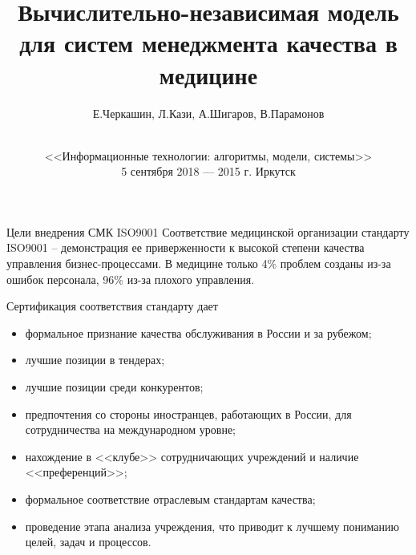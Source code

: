 \documentclass[10pt]{beamer}
\begin{document}
\title[Моделирование системы менеджмента качества в медицине]{Вычислительно-независимая модель для систем менеджмента качества в медицине}
\author{Е.Черкашин, Л.Кази, А.Шигаров, В.Парамонов}
\date[2015]{{}\\[1.5cm]
<<Информационные технологии: алгоритмы, модели, системы>>\\
5 сентября 2018 --- 2015 г.
Иркутск
}
\maketitle

\begin{frame}{Цели внедрения СМК ISO9001}
  Соответствие медицинской организации стандарту ISO9001 -- демонстрация ее приверженности к высокой степени качества управления бизнес-процессами. В медицине только 4\% проблем созданы из-за ошибок персонала, 96\% из-за плохого управления.
  \begin{block}{Сертификация соответствия стандарту дает}
    \begin{itemize}
    \item формальное признание качества обслуживания в России и за рубежом;
    \item лучшие позиции в тендерах;
    \item лучшие позиции среди конкурентов;
    \item предпочтения со стороны иностранцев, работающих в России, для сотрудничества на международном уровне;
    \item нахождение в <<клубе>> сотрудничающих учреждений и наличие <<преференций>>;
    \item формальное соответствие отраслевым стандартам качества;
    \item проведение этапа анализа учреждения, что приводит к лучшему пониманию целей, задач и процессов.
    \end{itemize}
  \end{block}
\end{frame}
\end{document}
